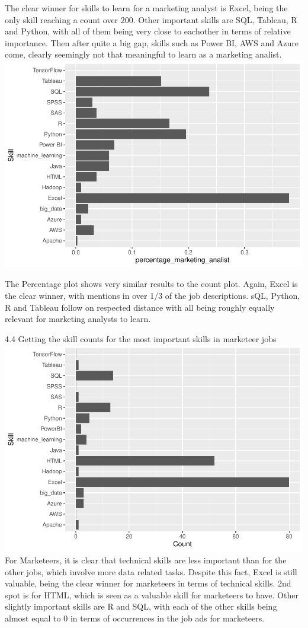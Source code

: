 \documentclass[
]{article}
\begin{document}
The clear winner for skills to learn for a marketing analyst is Excel,
being the only skill reaching a count over 200. Other important skills
are SQL, Tableau, R and Python, with all of them being very close to
eachother in terms of relative importance. Then after quite a big gap,
skills such as Power BI, AWS and Azure come, clearly seemingly not that
meaningful to learn as a marketing analist.\\
\includegraphics{analysis_files/figure-latex/unnamed-chunk-20-1.pdf}

The Percentage plot shows very similar results to the count plot. Again,
Excel is the clear winner, with mentions in over 1/3 of the job
descriptions. sQL, Python, R and Tableau follow on respected distance
with all being roughly equally relevant for marketing analysts to learn.

4.4 Getting the skill counts for the most important skills in marketeer
jobs
\includegraphics{analysis_files/figure-latex/unnamed-chunk-22-1.pdf} For
Marketeers, it is clear that technical skills are less important than
for the other jobs, which involve more data related tasks. Despite this
fact, Excel is still valuable, being the clear winner for marketeers in
terms of technical skills. 2nd spot is for HTML, which is seen as a
valuable skill for marketeers to have. Other slightly important skills
are R and SQL, with each of the other skills being almost equal to 0 in
terms of occurrences in the job ads for marketeers.
\end{document}
